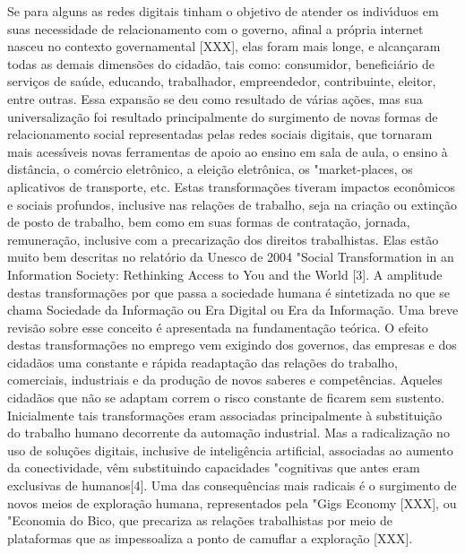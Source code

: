 \documentclass[
12pt,		%
openright,	%
twoside,  %
a4paper,			%
chapter=TITLE,		%
english,			%
french,				%
spanish,			%
brazil				%
]{USPSC-classe/USPSC}
\begin{document}
Se para alguns as redes digitais tinham o objetivo de atender os indiv\'{\i}duos em suas necessidade de relacionamento com o governo, afinal a pr\'opria internet nasceu no contexto governamental [XXX], elas foram mais longe, e alcan\c{c}aram todas as demais dimens\~oes do cidad\~ao, tais como: consumidor, benefici\'ario de servi\c{c}os de sa\'ude, educando, trabalhador, empreendedor, contribuinte, eleitor, entre outras.  Essa expans\~ao se deu como resultado de v\'arias a\c{c}\~oes, mas sua universaliza\c{c}\~ao foi resultado principalmente do surgimento de novas formas de relacionamento social representadas pelas redes sociais digitais, que tornaram mais acess\'{\i}veis novas ferramentas de apoio ao ensino em sala de aula, o ensino \`a dist\^ancia, o com\'ercio eletr\^onico, a elei\c{c}\~ao eletr\^onica, os "market-places, os aplicativos de transporte, etc. 
Estas transforma\c{c}\~oes tiveram impactos econ\^omicos e sociais profundos, inclusive nas rela\c{c}\~oes de trabalho, seja na cria\c{c}\~ao ou extin\c{c}\~ao de posto de trabalho, bem como em suas formas de contrata\c{c}\~ao, jornada, remunera\c{c}\~ao, inclusive com a precariza\c{c}\~ao dos direitos trabalhistas. Elas est\~ao muito bem descritas  no relat\'orio da Unesco  de 2004 "Social Transformation in an Information Society: Rethinking Access to You and the World [3]. A amplitude destas  transforma\c{c}\~oes por que passa a sociedade humana \'e sintetizada no que se chama  Sociedade da Informa\c{c}\~ao ou  Era Digital ou Era da Informa\c{c}\~ao. Uma breve revis\~ao sobre esse conceito  \'e apresentada na fundamenta\c{c}\~ao te\'orica. 
O efeito destas transforma\c{c}\~oes no emprego vem exigindo dos governos, das empresas e dos cidad\~aos uma constante e r\'apida readapta\c{c}\~ao  das rela\c{c}\~oes do trabalho, comerciais, industriais e da produ\c{c}\~ao de novos saberes e compet\^encias. Aqueles cidad\~aos que n\~ao se adaptam correm o risco constante de ficarem sem sustento. Inicialmente tais transforma\c{c}\~oes eram associadas principalmente \`a substitui\c{c}\~ao do trabalho humano decorrente da automa\c{c}\~ao industrial. Mas a radicaliza\c{c}\~ao no uso de solu\c{c}\~oes digitais, inclusive de intelig\^encia artificial, associadas ao aumento da conectividade, v\^em substituindo capacidades "cognitivas que antes eram exclusivas de humanos[4]. Uma das consequ\^encias mais radicais \'e o surgimento de novos meios de explora\c{c}\~ao humana, representados pela "Gigs Economy [XXX], ou "Economia do Bico, que precariza as rela\c{c}\~oes trabalhistas por meio de plataformas que as impessoaliza a ponto de camuflar a explora\c{c}\~ao [XXX].
\end{document}
